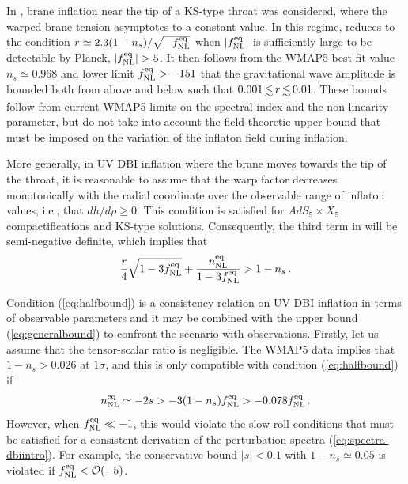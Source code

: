 In , brane inflation near the tip of a KS-type 
throat was considered, where the warped brane tension asymptotes to a 
constant value. In this regime,  reduces to 
the condition $r \simeq 2.3 (1-n_s)/\sqrt{-f_{\mathrm{NL}}^{\mathrm{eq}}}$ when $|f_{\mathrm{NL}}^{\mathrm{eq}}|$ is 
sufficiently large to be detectable by Planck, 
\ie $|f_{\mathrm{NL}}^{\mathrm{eq}}| > 5$. 
It then follows from the  
WMAP5 best-fit value $n_s \simeq 0.968$ and lower limit 
$f_{\mathrm{NL}}^{\mathrm{eq}} > -151$ \cite{Komatsu:2008hk} that the gravitational wave amplitude 
is bounded both from above and below such that $0.001 \, \lsim \, r 
\, \lsim \, 0.01$. These bounds follow from 
current WMAP5 limits on the spectral index and the 
non-linearity parameter, but do not take into account the 
field-theoretic upper bound that must be imposed 
on the variation of the inflaton field during inflation. 


More generally, in UV DBI inflation where the brane moves towards the 
tip of the throat, it is reasonable to assume 
that the warp factor decreases monotonically 
with the radial coordinate over the observable range of inflaton values, 
i.e., that $dh/d \rho \ge 0$. This condition is satisfied for  
$AdS_5 \times X_5$ compactifications and KS-type solutions. 
Consequently, the third term in 
 will be semi-negative definite, 
which implies that 
% 
\begin{equation}
\label{eq:halfbound}
\frac{r}{4} \sqrt{1-3f_{\mathrm{NL}}^{\mathrm{eq}}} + \frac{n_{\mathrm{NL}}^{\mathrm{eq}}}{1-3f_{\mathrm{NL}}^{\mathrm{eq}}} 
> 1-n_s \,.
\end{equation}
% 

Condition (\ref{eq:halfbound}) is a consistency relation on UV DBI 
inflation in terms of observable parameters and it 
may be combined with the upper bound 
(\ref{eq:generalbound}) to confront the scenario with observations.
Firstly, let us assume that the tensor-scalar ratio is negligible. 
The WMAP5 data implies that $1-n_s > 0.026$ at $1\sigma$, and this is only 
compatible with condition (\ref{eq:halfbound}) if 
% 
\begin{equation}
\label{eq:nnlbound}
n_{\mathrm{NL}}^{\mathrm{eq}} \simeq -2s > -3 (1-n_s ) f_{\mathrm{NL}}^{\mathrm{eq}} > -0.078 f_{\mathrm{NL}}^{\mathrm{eq}} \,.
\end{equation}
% 
However, when $f_{\mathrm{NL}}^{\mathrm{eq}} \ll -1$, this would violate the slow-roll conditions
that must be satisfied for a consistent 
derivation of the perturbation spectra 
(\ref{eq:spectra-dbiintro}). For example, the conservative 
bound $|s| < 0.1$ with $1-n_s \simeq 0.05$ is violated if  
$f_{\mathrm{NL}}^{\mathrm{eq}} < {\cal{O}} (-5)$. 

